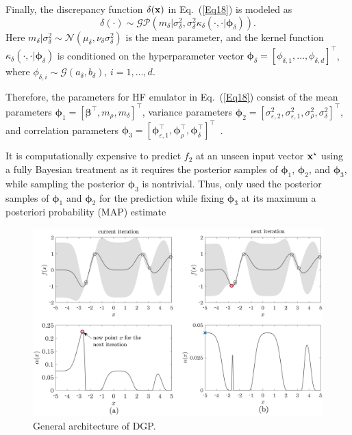 \documentclass[iicol,sn-basic]{sn-jnl}%
\theoremstyle{thmstyleone}%
\theoremstyle{thmstyletwo}
\theoremstyle{thmstylethree}
\begin{document}
\begin{linenumbers}
Finally, the discrepancy function $\delta({\bf x})$ in Eq.~(\ref{Eq18}) is modeled as
\begin{equation}\label{Eq23}
	\delta(\cdot) \sim \mathcal{GP}\left(m_\delta|\sigma^2_\delta,\sigma^2_\delta \kappa_\delta(\cdot,\cdot|{\boldsymbol \phi}_\delta)\right).
\end{equation}
Here $m_\delta|\sigma^2_\delta \sim \mathcal{N}(\mu_\delta,\nu_\delta\sigma^2_\delta)$ is the mean parameter, and the kernel function $\kappa_\delta(\cdot,\cdot|{\boldsymbol \phi}_\delta)$ is conditioned on the hyperparameter vector ${\boldsymbol \phi}_\delta =[\phi_{\delta,1},\dots,\phi_{\delta,d}]^\intercal$, where $\phi_{\delta,i} \sim \mathcal{G}(a_\delta,b_\delta)$, $i=1,\dots,d$.

Therefore, the parameters for HF emulator in Eq.~(\ref{Eq18}) consist of the mean parameters ${\boldsymbol \phi}_1 = [{\boldsymbol \beta}^\intercal,m_\rho,m_\delta]^\intercal$, variance parameters ${\boldsymbol \phi}_2 = [\sigma^2_{\varepsilon,2},\sigma^2_{\varepsilon,1},\sigma^2_\rho,\sigma^2_\delta]^\intercal$, and
correlation parameters ${\boldsymbol \phi}_3 = [{\boldsymbol \phi}_{\varepsilon,1}^\intercal,{\boldsymbol \phi}_{\rho}^\intercal,{\boldsymbol \phi}_{\delta}^\intercal]^\intercal$~\citep{Qian2008}. 

It is computationally expensive to predict $f_2$ at an unseen input vector $\bf x^\star$ using a fully Bayesian treatment as it requires the posterior samples of ${\boldsymbol \phi}_1$, ${\boldsymbol \phi}_2$, and ${\boldsymbol \phi}_3$, while sampling the posterior ${\boldsymbol \phi}_3$ is nontrivial.
Thus, \cite{Qian2008} only used the posterior samples of ${\boldsymbol \phi}_1$ and ${\boldsymbol \phi}_2$ for the prediction while fixing ${\boldsymbol \phi}_3$ at its maximum a posteriori probability (MAP) estimate

\begin{figure}
	\centering
	\includegraphics[scale=0.8]{Fig4.png}
	\caption{General architecture of DGP.}
	\label{Fig4}
\end{figure}


\end{linenumbers}
\end{document}
